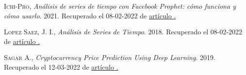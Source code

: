 \documentclass[a4paper,10pt]{article}
\begin{document}
\begin{thebibliography}{X}
 \textsc{Ichi-Pro}, \textit{Análisis de series de tiempo con Facebook Prophet: cómo funciona y cómo usarlo}. 2021. Recuperado el 08-02-2022 de \href{https://ichi.pro/es/analisis-de-series-de-tiempo-con-facebook-prophet-como-funciona-y-como-usarlo-265389504990778}{artículo \faExternalLink.}

 \textsc{Lopez Saez, J. I.}, \textit{Análisis de Series de Tiempo}. 2018. Recuperado el 08-02-2022 de \href{https://ri.itba.edu.ar/bitstream/handle/123456789/1230/TFI - Jose_ Ignacio Lo_pez Sa_ez.pdf?sequence=1&isAllowed=y}{artículo \faExternalLink.}

 \textsc{Sagar A.}, \textit{Cryptocurrency Price Prediction Using Deep Learning}. 2019. Recuperado el 12-03-2022 de \href{https://towardsdatascience.com/cryptocurrency-price-prediction-using-deep-learning-70cfca50dd3a}{artículo \faExternalLink.}

\end{thebibliography}
\end{document}
